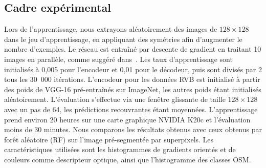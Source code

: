 \subsection{Cadre expérimental}
Lors de l'apprentissage, nous extrayons aléatoirement des images de $128\times128$ dans le jeu d'apprentissage, en appliquant des symétries afin d'augmenter le nombre d'exemples. Le réseau est entraîné par descente de gradient en traitant 10 images en parallèle, comme suggéré dans~\cite{audebert_semantic_2016}. Les taux d'apprentissage sont initialisés à 0,005 pour l'encodeur et 0,01 pour le décodeur, puis sont divisés par 2 tous les 30~000 itérations. L'encodeur pour les données RVB est initialisé à partir des poids de VGG-16 pré-entraînés sur ImageNet, les autres poids étant initialisés aléatoirement.
L'évaluation s'effectue via une fenêtre glissante de taille $128\times128$ avec un pas de 64, les prédictions recouvrantes étant moyennées. L'apprentissage prend environ 20 heures sur une carte graphique NVIDIA K20c et l'évaluation moins de 30 minutes. Nous comparons les résultats obtenus avec ceux obtenus par forêt aléatoire (RF) sur l'image pré-segmentée par superpixels. Les caractéristiques utilisées sont les histogrammes de gradients orientés et de couleurs comme descripteur optique, ainsi que l'histogramme des classes OSM.

